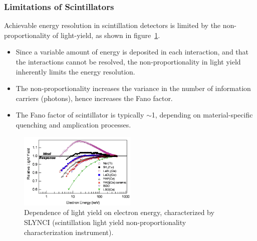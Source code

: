 \subsubsection{Limitations of Scintillators}
Achievable energy resolution in scintillation detectors is limited by the non-proportionality of light-yield, as shown in figure~\ref{fig:scintillator_nonlinearity}. 
\begin{itemize}
    \item Since a variable amount of energy is deposited in each interaction, and that the interactions cannot be resolved, the non-proportionality in light yield inherently limits the energy resolution.
    \item The non-proportionality increases the variance in the number of information carriers (photons), hence increases the Fano factor.
    \item The Fano factor of scintillator is typically $\sim$1, depending on material-specific quenching and amplication processes.
\end{itemize}
\begin{figure}[ht]
    \centering
    \includegraphics[width=0.5\textwidth]{images/scintillator_nonlinearity.png}
    \caption{Dependence of light yield on electron energy, characterized by SLYNCI (scintillation light yield non-proportionality characterization instrument).}
    \label{fig:scintillator_nonlinearity}
\end{figure}